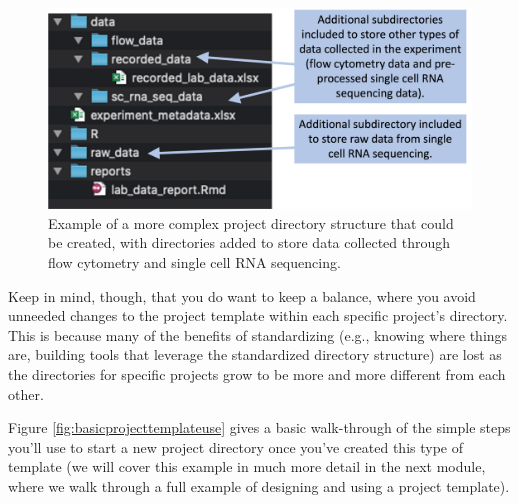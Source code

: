 \documentclass[]{tufte-book}
\begin{document}
\begin{figure}
\includegraphics[width=\textwidth]{figures/project_template_morecomplex} \caption[Example of a more complex project directory structure that could be created, with directories added to store data collected through flow cytometry and single cell RNA sequencing]{Example of a more complex project directory structure that could be created, with directories added to store data collected through flow cytometry and single cell RNA sequencing.}\label{fig:projecttemplatecomplex}
\end{figure}

Keep in mind, though, that you do want to keep a balance, where you avoid
unneeded changes to the project template within each specific project's
directory. This is because many of the benefits of standardizing (e.g.,
knowing where things are, building tools that leverage the standardized
directory structure) are lost as the directories for specific projects grow
to be more and more different from each other.

Figure \ref{fig:basicprojecttemplateuse} gives a basic walk-through of the
simple steps you'll use to start a new project directory once you've created
this type of template (we will cover this example in much more detail in the
next module, where we walk through a full example of designing and using a
project template).
\end{document}
